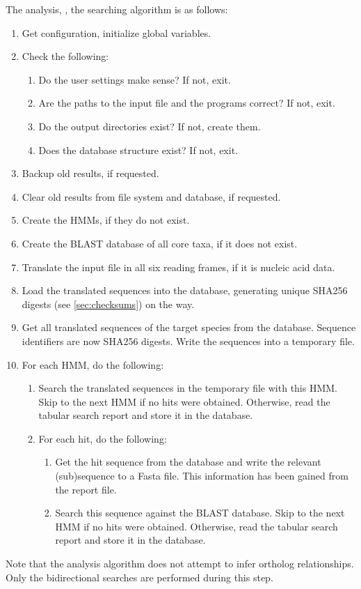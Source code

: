 The analysis, \ie, the searching algorithm is as follows:

\begin{enumerate}
	\item Get configuration, initialize global variables.
	\item Check the following:
	\begin{enumerate}
		\item Do the user settings make sense? If not, exit.
		\item Are the paths to the input file and the programs correct? If not,
			exit.
		\item Do the output directories exist? If not, create them.
		\item Does the database structure exist? If not, exit.
	\end{enumerate}
	\item Backup old results, if requested.
	\item Clear old results from file system and database, if requested.
	\item Create the HMMs, if they do not exist.
	\item Create the BLAST database of all core taxa, if it does not exist.
	\item Translate the input file in all six reading frames, if it is nucleic
		acid data.
	\item Load the translated sequences into the database, generating unique
		SHA256 digests (see \autoref{sec:checksums}) on the way.
	\item Get all translated sequences of the target species from the database.
		Sequence identifiers are now SHA256 digests. Write the sequences into a
		temporary file.
	\item For each HMM, do the following:
	\begin{enumerate}
		\item Search the translated sequences in the temporary file with this HMM.
			Skip to the next HMM if no hits were obtained. Otherwise, read the tabular
			search report and store it in the database. 
		\item For each hit, do the following:
		\begin{enumerate}
			\item Get the hit sequence from the database and write the relevant
				(sub)sequence to a Fasta file. This information has been gained from the
				 report file.
			\item Search this sequence against the BLAST database. Skip to the next
				HMM if no hits were obtained. Otherwise, read the tabular search report
				and store it in the database. 
		\end{enumerate}
	\end{enumerate}
\end{enumerate}

Note that the analysis algorithm does not attempt to infer ortholog
relationships. Only the bidirectional searches are performed during this step. 
